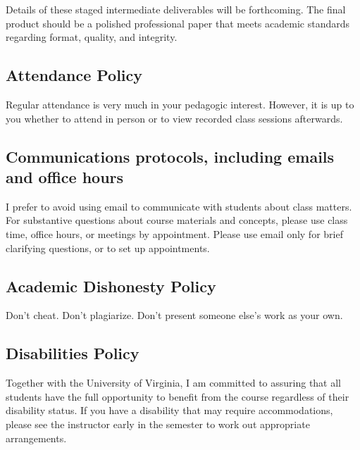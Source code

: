\documentclass[
]{book}
\begin{document}
Details of these staged intermediate deliverables will be forthcoming. The final product should be a polished professional paper that meets academic standards regarding format, quality, and integrity.

\hypertarget{attendance-policy}{%
\subsection*{Attendance Policy}\label{attendance-policy}}

Regular attendance is very much in your pedagogic interest. However, it is up to you whether to attend in person or to view recorded class sessions afterwards.

\hypertarget{communications-protocols-including-emails-and-office-hours}{%
\subsection*{Communications protocols, including emails and office hours}\label{communications-protocols-including-emails-and-office-hours}}

I prefer to avoid using email to communicate with students about class matters. For substantive questions about course materials and concepts, please use class time, office hours, or meetings by appointment. Please use email only for brief clarifying questions, or to set up appointments.

\hypertarget{academic-dishonesty-policy}{%
\subsection*{Academic Dishonesty Policy}\label{academic-dishonesty-policy}}

Don't cheat. Don't plagiarize. Don't present someone else's work as your own.

\hypertarget{disabilities-policy}{%
\subsection*{Disabilities Policy}\label{disabilities-policy}}

Together with the University of Virginia, I am committed to assuring that all students have the full opportunity to benefit from the course regardless of their disability status. If you have a disability that may require accommodations, please see the instructor early in the semester to work out appropriate arrangements.
\end{document}
